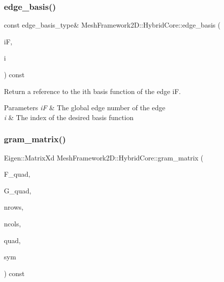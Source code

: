 \subsubsection{\texorpdfstring{edge\+\_\+basis()}{edge\_basis()}}
{\footnotesize\ttfamily const edge\+\_\+basis\+\_\+type\& Mesh\+Framework2\+D\+::\+Hybrid\+Core\+::edge\+\_\+basis (\begin{DoxyParamCaption}\item[{size\+\_\+t}]{iF,  }\item[{size\+\_\+t}]{i }\end{DoxyParamCaption}) const}



Return a reference to the i\textquotesingle{}th basis function of the edge iF. 


\begin{DoxyParams}{Parameters}
{\em iF} & The global edge number of the edge \\
\hline
{\em i} & The index of the desired basis function \\
\hline
\end{DoxyParams}
\mbox{\label{classMeshFramework2D_1_1HybridCore_a65c77d7e341d67b34662419db244705b}} 
\subsubsection{\texorpdfstring{gram\+\_\+matrix()}{gram\_matrix()}}
{\footnotesize\ttfamily Eigen\+::\+Matrix\+Xd Mesh\+Framework2\+D\+::\+Hybrid\+Core\+::gram\+\_\+matrix (\begin{DoxyParamCaption}\item[{const std\+::vector$<$ Eigen\+::\+Matrix\+Xd $>$ \&}]{F\+\_\+quad,  }\item[{const std\+::vector$<$ Eigen\+::\+Matrix\+Xd $>$ \&}]{G\+\_\+quad,  }\item[{const size\+\_\+t \&}]{nrows,  }\item[{const size\+\_\+t \&}]{ncols,  }\item[{const std\+::vector$<$ \hyperlink{structMeshFramework2D_1_1HybridCore_1_1qrule}{Hybrid\+Core\+::qrule} $>$ \&}]{quad,  }\item[{const bool \&}]{sym }\end{DoxyParamCaption}) const}


